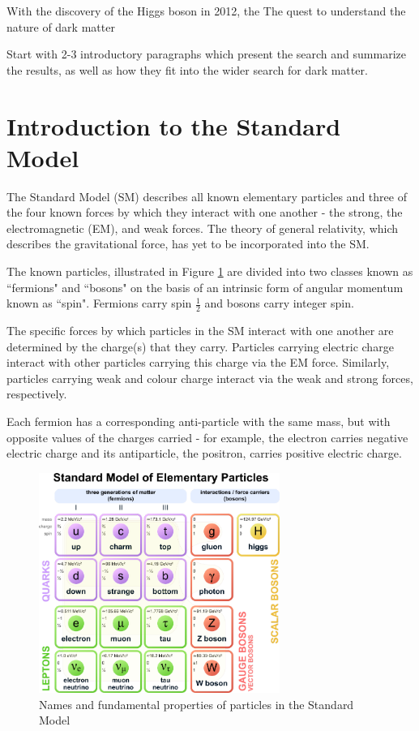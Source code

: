 \label{chapter:introduction}

With the discovery of the Higgs boson in 2012, the The quest to understand the nature of dark matter 

Start with 2-3 introductory paragraphs which present the search and summarize the results, as well as how they fit into the wider search for dark matter. 

\section{Introduction to the Standard Model}

The Standard Model (SM) describes all known elementary particles and three of the four known forces by which they interact with one another - the strong, the electromagnetic (EM), and weak forces. The theory of general relativity, which describes the gravitational force, has yet to be incorporated into the SM. 

The known particles, illustrated in Figure \ref{fig:standard_model} are divided into two classes known as ``fermions" and ``bosons" on the basis of an intrinsic form of angular momentum known as ``spin". Fermions carry spin \(\frac{1}{2}\) and bosons carry integer spin. 

The specific forces by which particles in the SM interact with one another are determined by the charge(s) that they carry. Particles carrying electric charge interact with other particles carrying this charge via the EM force. Similarly, particles carrying weak and colour charge interact via the weak and strong forces, respectively. 

Each fermion has a corresponding anti-particle with the same mass, but with opposite values of the charges carried - for example, the electron carries negative electric charge and its antiparticle, the positron, carries positive electric charge. 

\begin{figure}[H]
	\centering
	\includegraphics[width=0.7\textwidth]{Figures/1/StandardModel.pdf}
	\caption[]{Names and fundamental properties of particles in the Standard Model}
	\label{fig:standard_model}
\end{figure}

